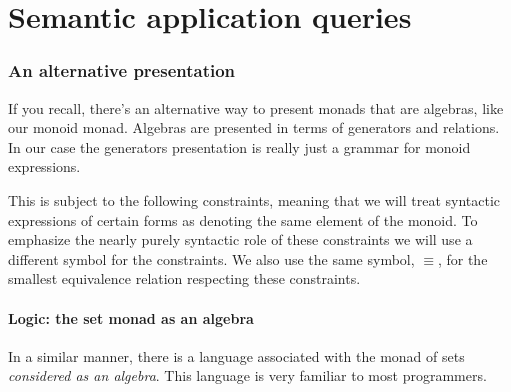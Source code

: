 \section{Semantic application queries}

\subsubsection{An alternative presentation}

If you recall, there's an alternative way to present monads that are
algebras, like our monoid monad. Algebras are presented in terms of
generators and relations. In our case the generators presentation is
really just a grammar for monoid expressions.


This is subject to the following constraints, meaning that we will
treat syntactic expressions of certain forms as denoting the same
element of the monoid. To emphasize the nearly purely syntactic role
of these constraints we will use a different symbol for the
constraints. We also use the same symbol, $\equiv$, for the smallest equivalence
relation respecting these constraints.


\paragraph{Logic: the set monad as an algebra}
In a similar manner, there is a language associated with the monad of
sets \emph{considered as an algebra}. This language is very familiar
to most programmers.


